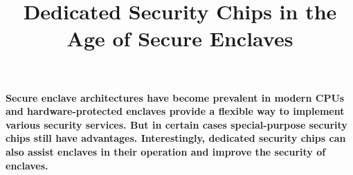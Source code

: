 

\graphicspath{{images/}}

\title{Dedicated Security Chips in the Age of Secure Enclaves} 


\maketitle
\thispagestyle{empty}

{\bfseries
Secure enclave architectures have become prevalent in modern CPUs and hardware-protected enclaves provide a flexible way to implement various security services. But in certain cases special-purpose security chips still have advantages. Interestingly, dedicated security chips can also assist enclaves in their operation and improve the security of enclaves.}












